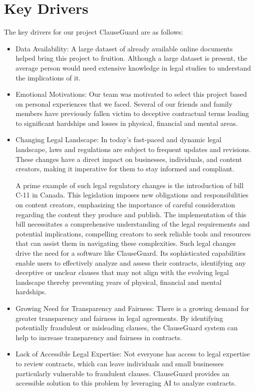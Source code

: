\section{Key Drivers \cite{DMuresanRequirements} \label{Section::Key Drivers} }
The key drivers for our project ClauseGuard are as follows: 
\begin{itemize}
    \item Data Availability: A large dataset of already available online documents helped bring this project to fruition. Although a large dataset is present, the average person would need extensive knowledge in legal studies to understand the implications of it. 
    \item Emotional Motivations: Our team was motivated to select this project based on personal experiences that we faced. Several of our friends and family members have previously fallen victim to deceptive contractual terms leading to significant hardships and losses in physical, financial and mental areas. 
    \item Changing Legal Landscape: In today's fast-paced and dynamic legal landscape, laws and regulations are subject to frequent updates and revisions. These changes have a direct impact on businesses, individuals, and content creators, making it imperative for them to stay informed and compliant.

A prime example of such legal regulatory changes is the introduction of bill C-11 in Canada. This legislation imposes new obligations and responsibilities on content creators, emphasizing the importance of careful consideration regarding the content they produce and publish. The implementation of this bill necessitates a comprehensive understanding of the legal requirements and potential implications, compelling creators to seek reliable tools and resources that can assist them in navigating these complexities. 
Such legal changes drive the need for a software like ClauseGuard. Its sophisticated capabilities enable users to effectively analyze and assess their contracts, identifying any deceptive or unclear clauses that may not align with the evolving legal landscape thereby preventing years of physical, financial and mental hardships.

\item Growing Need for Transparency and Fairness: There is a growing demand for greater transparency and fairness in legal agreements. By identifying potentially fraudulent or misleading clauses, the ClauseGuard system can help to increase transparency and fairness in contracts.

\item Lack of Accessible Legal Expertise: Not everyone has access to legal expertise to review contracts, which can leave individuals and small businesses particularly vulnerable to fraudulent clauses. ClauseGuard provides an accessible solution to this problem by leveraging AI to analyze contracts.
\end{itemize}



